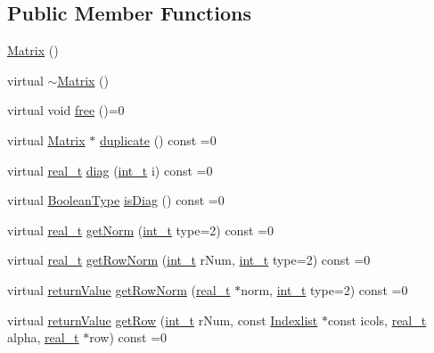 \subsection*{Public Member Functions}
\begin{DoxyCompactItemize}
\item 
\hyperlink{class_matrix_a2dba13c45127354c9f75ef576f49269b}{Matrix} ()
\item 
virtual \hyperlink{class_matrix_ac8d10e89f7b47ab95a341d70df651554}{$\sim$\+Matrix} ()
\item 
virtual void \hyperlink{class_matrix_ae13ca77389c2eae7b3eba79cb9fefecb}{free} ()=0
\item 
virtual \hyperlink{class_matrix}{Matrix} $\ast$ \hyperlink{class_matrix_abf41d80f7392e9d63e9b2fa4b822d3b9}{duplicate} () const =0
\item 
virtual \hyperlink{qp_o_a_s_e_s__wrapper_8h_a0d00e2b3dfadee81331bbb39068570c4}{real\+\_\+t} \hyperlink{class_matrix_a8d76d428884fdb7a3deade8cad3c4b0a}{diag} (\hyperlink{_types_8hpp_ab6fd6105e64ed14a0c9281326f05e623}{int\+\_\+t} i) const =0
\item 
virtual \hyperlink{_types_8hpp_a20f82124c82b6f5686a7fce454ef9089}{Boolean\+Type} \hyperlink{class_matrix_a1f5595f0147658d9f79f92dd283dcbac}{is\+Diag} () const =0
\item 
virtual \hyperlink{qp_o_a_s_e_s__wrapper_8h_a0d00e2b3dfadee81331bbb39068570c4}{real\+\_\+t} \hyperlink{class_matrix_a8d906c25118e71467aba6434612504b2}{get\+Norm} (\hyperlink{_types_8hpp_ab6fd6105e64ed14a0c9281326f05e623}{int\+\_\+t} type=2) const =0
\item 
virtual \hyperlink{qp_o_a_s_e_s__wrapper_8h_a0d00e2b3dfadee81331bbb39068570c4}{real\+\_\+t} \hyperlink{class_matrix_ac4c0a395cd507ba0801b731765c586f7}{get\+Row\+Norm} (\hyperlink{_types_8hpp_ab6fd6105e64ed14a0c9281326f05e623}{int\+\_\+t} r\+Num, \hyperlink{_types_8hpp_ab6fd6105e64ed14a0c9281326f05e623}{int\+\_\+t} type=2) const =0
\item 
virtual \hyperlink{_message_handling_8hpp_a81d556f613bfbabd0b1f9488c0fa865e}{return\+Value} \hyperlink{class_matrix_a7809892ec8eefd5963915b56564917ed}{get\+Row\+Norm} (\hyperlink{qp_o_a_s_e_s__wrapper_8h_a0d00e2b3dfadee81331bbb39068570c4}{real\+\_\+t} $\ast$norm, \hyperlink{_types_8hpp_ab6fd6105e64ed14a0c9281326f05e623}{int\+\_\+t} type=2) const =0
\item 
virtual \hyperlink{_message_handling_8hpp_a81d556f613bfbabd0b1f9488c0fa865e}{return\+Value} \hyperlink{class_matrix_a7d7820b8b02f4abcf82330596b317ad6}{get\+Row} (\hyperlink{_types_8hpp_ab6fd6105e64ed14a0c9281326f05e623}{int\+\_\+t} r\+Num, const \hyperlink{class_indexlist}{Indexlist} $\ast$const icols, \hyperlink{qp_o_a_s_e_s__wrapper_8h_a0d00e2b3dfadee81331bbb39068570c4}{real\+\_\+t} alpha, \hyperlink{qp_o_a_s_e_s__wrapper_8h_a0d00e2b3dfadee81331bbb39068570c4}{real\+\_\+t} $\ast$row) const =0

\end{DoxyCompactItemize}
